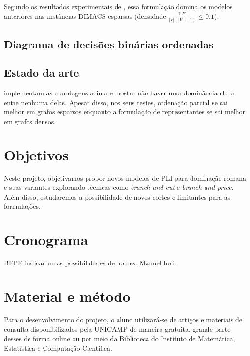 \documentclass[11pt]{article}
\begin{document}
Segundo os resultados experimentais de \autocite{Jabrayilov2022StrengthenedPartialOrdering}, essa formulação domina os modelos anteriores nas instâncias DIMACS \autocite{GraphColoringInstances} esparsas (densidade \(\frac{2|E|}{|V|(|V|-1)} \leq 0.1\)).

\subsection{Diagrama de decisões binárias ordenadas}
\label{sec:org5f70b18}
\autocite{Hoeve2021Graphcoloringdecision}
\subsection{Estado da arte}
\label{sec:org6343b0f}
\textcite{Jabrayilov2018NewIntegerLinear} implementam as abordagens acima e mostra não haver uma dominância clara entre nenhuma delas.
Apesar disso, nos seus testes, ordenação parcial se sai melhor em grafos esparsos enquanto a formulação de representantes se sai melhor em grafos densos.
\section{Objetivos}
\label{sec:org141cd20}
Neste projeto, objetivamos propor novos modelos de PLI para dominação romana e suas variantes explorando técnicas como \emph{branch-and-cut} e \emph{branch-and-price}.
Além disso, estudaremos a possibilidade de novos cortes e limitantes para as formulações.

\textcite{Lima2022Exactsolutionnetwork}
\textcite{Pessoa2021SolvingBinPacking}
\section{Cronograma}
\label{sec:org7607014}
BEPE indicar umas possibilidades de nomes. Manuel Iori.

\section{Material e método}
\label{sec:orge148fce}
Para o desenvolvimento do projeto, o aluno utilizará-se de artigos e materiais de consulta disponibilizados pela UNICAMP de maneira gratuita, grande parte desses de forma online ou por meio da Biblioteca do Instituto de Matemática, Estatística e Computação Científica.
\end{document}
